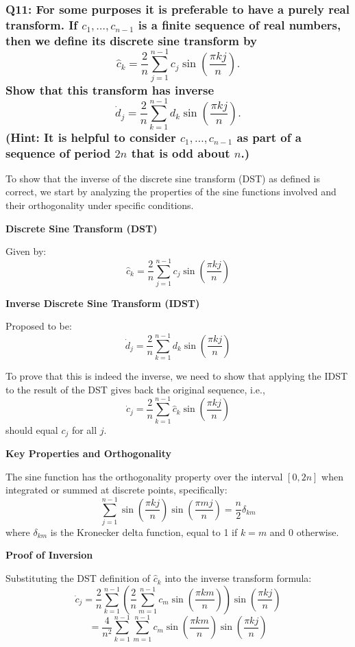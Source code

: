 \documentclass[8pt]{article}
\begin{document}
\subsubsection*{Q11:
For some purposes it is preferable to have a purely real transform. If \(c_1, \ldots, c_{n-1}\) is a finite sequence of real numbers, then we define its discrete sine transform by
\[
\hat{c}_k = \frac{2}{n} \sum_{j=1}^{n-1} c_j \sin \left( \frac{\pi kj}{n} \right).
\]
Show that this transform has inverse
\[
\dot{d}_j = \frac{2}{n} \sum_{k=1}^{n-1} d_k \sin \left( \frac{\pi kj}{n} \right).
\]
(Hint: It is helpful to consider \(c_1, \ldots, c_{n-1}\) as part of a sequence of period \(2n\) that is odd about \(n\).)}

To show that the inverse of the discrete sine transform (DST) as defined is correct, we start by analyzing the properties of the sine functions involved and their orthogonality under specific conditions.

\textbf{Discrete Sine Transform (DST)}

Given by:
\[
\hat{c}_k = \frac{2}{n} \sum_{j=1}^{n-1} c_j \sin \left( \frac{\pi kj}{n} \right)
\]

\textbf{Inverse Discrete Sine Transform (IDST)}

Proposed to be:
\[
\dot{d}_j = \frac{2}{n} \sum_{k=1}^{n-1} d_k \sin \left( \frac{\pi kj}{n} \right)
\]

To prove that this is indeed the inverse, we need to show that applying the IDST to the result of the DST gives back the original sequence, i.e.,
\[
\dot{c}_j = \frac{2}{n} \sum_{k=1}^{n-1} \hat{c}_k \sin \left( \frac{\pi kj}{n} \right)
\]
should equal \( c_j \) for all \( j \).

\textbf{Key Properties and Orthogonality}

The sine function has the orthogonality property over the interval \([0, 2n]\) when integrated or summed at discrete points, specifically:
\[
\sum_{j=1}^{n-1} \sin \left( \frac{\pi kj}{n} \right) \sin \left( \frac{\pi mj}{n} \right) = \frac{n}{2} \delta_{km}
\]
where \( \delta_{km} \) is the Kronecker delta function, equal to 1 if \( k = m \) and 0 otherwise.

\textbf{Proof of Inversion}

Substituting the DST definition of \( \hat{c}_k \) into the inverse transform formula:
\[
\dot{c}_j = \frac{2}{n} \sum_{k=1}^{n-1} \left( \frac{2}{n} \sum_{m=1}^{n-1} c_m \sin \left( \frac{\pi km}{n} \right) \right) \sin \left( \frac{\pi kj}{n} \right)
\]
\[
= \frac{4}{n^2} \sum_{k=1}^{n-1} \sum_{m=1}^{n-1} c_m \sin \left( \frac{\pi km}{n} \right) \sin \left( \frac{\pi kj}{n} \right)
\]
\end{document}
